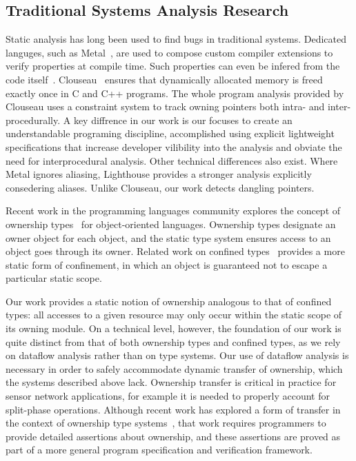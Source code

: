 \subsection{Traditional Systems Analysis Research}



Static analysis has long been used to find bugs in traditional systems.
%
Dedicated languges, such as Metal~\cite{engler00checking}, are used to
compose custom compiler extensions to verify properties at compile time.
%
Such properties can even be infered from the code
itself~\cite{kremenek06from}.
%
Clouseau~\cite{heine03practical} ensures that dynamically allocated memory
is freed exactly once in C and C++ programs.
%
The whole program analysis provided by Clouseau uses a constraint system to
track owning pointers both intra- and inter-procedurally.
%
A key diffrence in our work is our focuses to create an understandable
programing discipline, accomplished using explicit lightweight
specifications that increase developer vilibility into the analysis and
obviate the need for interprocedural analysis.
%
Other technical differences also exist.
%
Where Metal ignores aliasing, Lighthouse provides a stronger analysis
explicitly consedering aliases.
%
Unlike Clouseau, our work detects dangling pointers.




Recent work in the programming languages community explores the concept of
ownership types~\cite{ownership,ownership2,BoyapatiEtAl02,aliasjava} for
object-oriented languages. 
%
Ownership types designate an owner object for each object, and the static
type system ensures access to an object goes through its owner.
%
Related work on confined types~\cite{confined1,confined2} provides a more
static form of confinement, in which an object is guaranteed not to escape a
particular static scope.



Our work provides a static notion of ownership analogous to that of confined
types:  all accesses to a given resource may only occur within the static
scope of its owning module.  
%
On a technical level, however, the foundation of our work is quite distinct
from that of both ownership types and confined types, as we rely on dataflow
analysis rather than on type systems.  
%
Our use of dataflow analysis is necessary in order to safely accommodate
dynamic transfer of ownership, which the systems described above lack.  
%
Ownership transfer is critical in practice for sensor network applications,
for example it is needed to properly account for split-phase operations.  
%
Although recent work has explored a form of transfer in the context of
ownership type systems~\cite{DBLP:conf/ecoop/BanerjeeN05}, that work
requires programmers to provide detailed assertions about ownership, and
these assertions are proved as part of a more general program specification
and verification framework.



